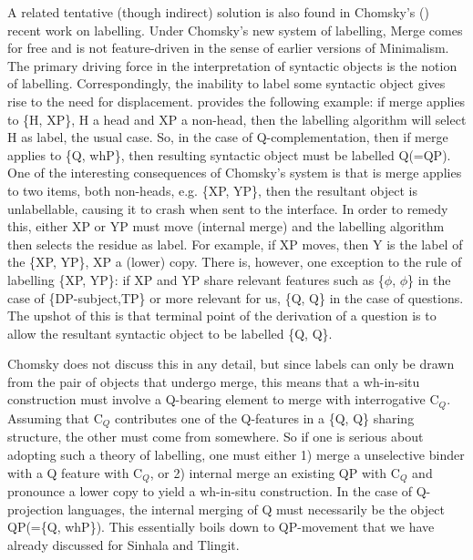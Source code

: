 \documentclass{glossa}
\begin{document}
A related tentative (though indirect) solution is also found in Chomsky's (\citeyear{chomsky:2013,chomsky:2015}) recent work on labelling. Under Chomsky's new system of labelling, Merge comes for free and is not feature-driven in the sense of earlier versions of Minimalism. The primary driving force in the interpretation of syntactic objects is the notion of labelling. Correspondingly, the inability to label some syntactic object gives rise to the need for displacement. \cite{chomsky:2013} provides the following example: if merge applies to \{H, XP\}, H a head and XP a non-head, then the labelling algorithm will select H as label, the usual case. So, in the case of Q-complementation, then if merge applies to \{Q, whP\}, then resulting syntactic object must be labelled Q(=QP). One of the interesting consequences of Chomsky's system is that is merge applies to two items, both non-heads, e.g. \{XP, YP\}, then the resultant object is unlabellable, causing it to crash when sent to the interface. In order to remedy this, either XP or YP must move (internal merge) and the labelling algorithm then selects the residue as label. For example, if XP moves, then Y is the label of the \{XP, YP\}, XP a (lower) copy. There is, however, one exception to the rule of labelling \{XP, YP\}: if XP and YP share relevant features such as \{$\phi$, $\phi$\} in the case of \{DP-subject,TP\} or more relevant for us, \{Q, Q\} in the case of questions. The upshot of this is that terminal point of the derivation of a question is to allow the resultant syntactic object to be labelled \{Q, Q\}.

Chomsky does not discuss this in any detail, but since labels can only be drawn from the pair of objects that undergo merge, this means that a wh-in-situ construction must involve a Q-bearing element to merge with interrogative C$_Q$. Assuming that C$_Q$ contributes one of the Q-features in a \{Q, Q\} sharing structure, the other must come from somewhere. So if one is serious about adopting such a theory of labelling, one must either 1) merge a unselective binder with a Q feature with C$_Q$, or 2) internal merge an existing QP with C$_Q$ and pronounce a lower copy to yield a wh-in-situ construction. In the case of Q-projection languages, the internal merging of Q must necessarily be the object QP(=\{Q, whP\}). This essentially boils down to QP-movement that we have already discussed for Sinhala and Tlingit.
\end{document}
